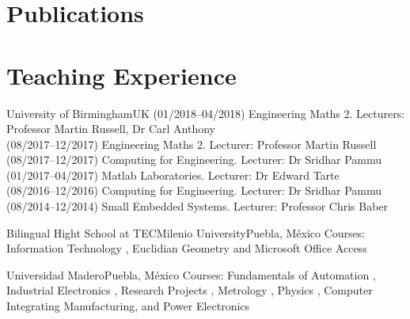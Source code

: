 \documentclass[10pt,a4paper,roman]{moderncv}
\begin{document}
\section{Publications}




%
%


\section{Teaching Experience}

{University of Birmingham}{UK}{}
{
(01/2018--04/2018) Engineering Maths 2. Lecturers: Professor Martin Russell, Dr Carl Anthony \\
(08/2017--12/2017) Engineering Maths 2. Lecturer: Professor Martin Russell \\
(08/2017--12/2017) Computing for Engineering. Lecturer: Dr Sridhar Pammu \\
(01/2017--04/2017) Matlab Laboratories. Lecturer: Dr Edward Tarte \\
(08/2016--12/2016) Computing for Engineering. Lecturer: Dr Sridhar Pammu \\
(08/2014--12/2014) Small Embedded Systems. Lecturer: Professor Chris Baber
}

{Bilingual Hight School at TECMilenio University}{Puebla, M\'exico}{}
{Courses:
Information Technology \href{https://sites.google.com/site/perezxochicale/teaching/iit}{\faExternalLink},
Euclidian Geometry  \href{https://sites.google.com/site/perezxochicale/teaching/euclidean-geometry}{\faExternalLink}
and
Microsoft Office Access \href{https://sites.google.com/site/perezxochicale/teaching/moa}{\faExternalLink}
}

{Universidad Madero}{Puebla, M\'exico}{}
{Courses: Fundamentals of Automation
\href{https://sites.google.com/site/perezxochicale/digital-electronics}{\faExternalLink},
Industrial Electronics \href{https://sites.google.com/site/perezxochicale/ie}{\faExternalLink},
Research Projects \href{https://sites.google.com/site/perezxochicale/latex/thesistemplate}{\faExternalLink},
Metrology \href{https://sites.google.com/site/perezxochicale/metrology}{\faExternalLink},
Physics \href{http://goo.gl/fffnG}{\faExternalLink},
Computer Integrating Manufacturing, and Power Electronics
}
\end{document}
